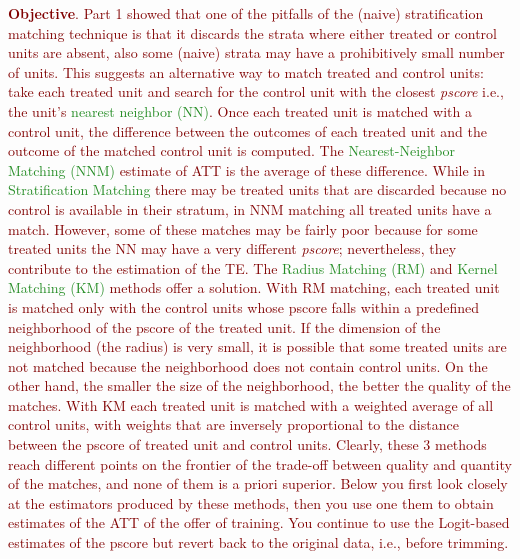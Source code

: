 
\noindent \textcolor{Maroon}{\textbf{Objective}. Part 1 showed that one of the pitfalls of the (naive) stratification matching technique is that it discards the strata where either treated or control units are absent, also some (naive) strata may have a prohibitively small number of units. This suggests an alternative way to match treated and control units: take each treated unit and search for the control unit with the closest \textit{pscore} i.e., the unit's \textcolor{ForestGreen}{nearest neighbor (NN)}. Once each treated unit is matched with a control unit, the difference between the outcomes of each treated unit and the outcome of the matched control unit is computed. The \textcolor{ForestGreen}{Nearest-Neighbor Matching (NNM)} estimate of ATT is the average of these difference. While in \textcolor{ForestGreen}{Stratification Matching} there may be treated units that are discarded because no control is available in their stratum, in NNM matching all treated units have a match. However, some of these matches may be fairly poor because for some treated units the NN may have a very different \textit{pscore}; nevertheless, they contribute to the estimation of the TE. The \textcolor{ForestGreen}{Radius Matching (RM)} and \textcolor{ForestGreen}{Kernel Matching (KM)} methods offer a solution. With RM matching, each treated unit is matched only with the control units whose pscore falls within a predefined neighborhood of the pscore of the treated unit. If the dimension of the neighborhood (the radius) is very small, it is possible that some treated units are not matched because the neighborhood does not contain control units. On the other hand, the smaller the size of the neighborhood, the better the quality of the matches. With KM each treated unit is matched with a weighted average of all control units, with weights that are inversely proportional to the distance between the pscore of treated unit and control units. Clearly, these 3 methods reach different points on the frontier of the trade-off between quality and quantity of the matches, and none of them is a priori superior. Below you first look closely at the estimators produced by these methods, then you use one them to obtain estimates of the ATT of the offer of training. You continue to use the Logit-based estimates of the pscore but revert back to the original data, i.e., before trimming.}\\

